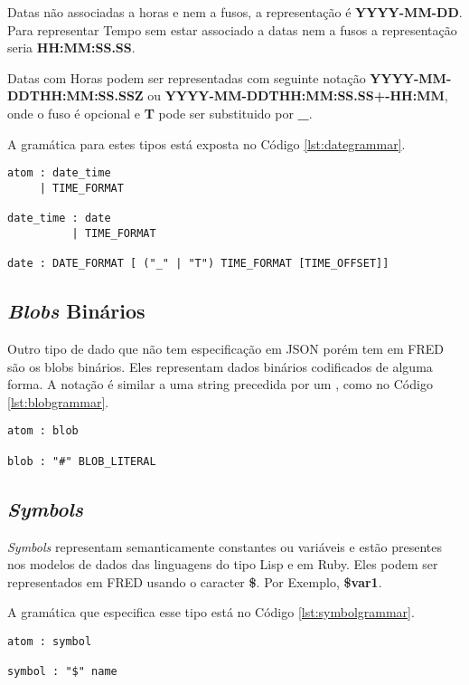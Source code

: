 Datas não associadas a horas e nem a fusos, a representação é \textbf{YYYY-MM-DD}.
Para representar Tempo sem estar associado a datas nem a fusos a representação seria \textbf{HH:MM:SS.SS}.

Datas com Horas podem ser representadas com seguinte notação \textbf{YYYY-MM-DDTHH:MM:SS.SSZ} ou
\textbf{YYYY-MM-DDTHH:MM:SS.SS+-HH:MM}, onde o fuso é opcional e \textbf{T} pode ser 
substituido por \textbf{\_}.

A gramática para estes tipos está exposta no Código \ref{lst:dategrammar}.

\begin{lstlisting}[caption=Gramática para datas e horas,label={lst:dategrammar}]
atom : date_time 
     | TIME_FORMAT

date_time : date
          | TIME_FORMAT

date : DATE_FORMAT [ ("_" | "T") TIME_FORMAT [TIME_OFFSET]]
\end{lstlisting}  

\subsection{\textit{Blobs} Binários}

Outro tipo de dado que não tem especificação em JSON porém tem em FRED são os blobs binários. Eles
representam dados binários codificados de alguma forma. A notação é similar a uma string precedida
por um , como no Código \ref{lst:blobgrammar}.

\begin{lstlisting}[caption=Gramática para blobs,label={lst:blobgrammar}]
atom : blob

blob : "#" BLOB_LITERAL
\end{lstlisting}

\subsection{\textit{Symbols}}

\textit{Symbols} representam semanticamente constantes ou variáveis e estão 
presentes nos modelos de dados das linguagens do tipo Lisp e em Ruby. 
Eles podem ser representados em FRED usando o caracter \textbf{\$}. Por Exemplo, \textbf{\$var1}.

A gramática que especifica esse tipo está no Código \ref{lst:symbolgrammar}.

\begin{lstlisting}[float,floatplacement=H,caption=Gramática para symbols,label={lst:symbolgrammar}]
atom : symbol

symbol : "$" name
\end{lstlisting}

